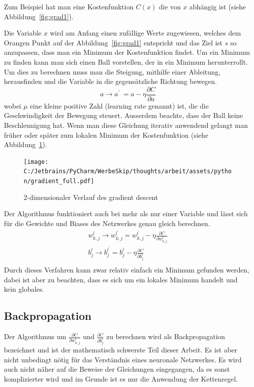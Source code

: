 \documentclass[12pt,a4paper]{report}
\begin{document}
Zum Beispiel hat man eine Kostenfunktion $C(x)$ die von $x$ abhängig ist (siehe Abbildung~\ref{fig:grad1}).

Die Variable $x$ wird am Anfang einen zufällige Werte zugewiesen,
welches dem Orangen Punkt auf der Abbildung~\ref{fig:grad1} entspricht und das Ziel ist $s$ so anzupassen,
dass man ein Minimum der Kostenfunktion findet.
Um ein Minimum zu finden kann man sich einen Ball vorstellen, der in ein Minimum herunterrollt.
Um dies zu berechnen muss man die Steigung, mithilfe einer Ableitung, herausfinden und die Variable in die
gegensätzliche Richtung bewegen.
\[a \rightarrow a^\prime\ = a - \eta\frac{\partial C}{\partial a}\]
wobei $\mu$ eine kleine positive Zahl (learning rate genannt) ist, die die Geschwindigkeit der Bewegung steuert.
Ausserdem beachte, dass der Ball keine Beschleunigung hat.
Wenn man diese Gleichung iterativ anwendend gelangt man früher oder später zum lokalen Minimum der Kostenfunktion (siehe Abbildung~\ref{fig:grad2}).

\begin{figure}[h]%
    \centering
    \texttt{[image: C:/Jetbrains/PyCharm/WerbeSkip/thoughts/arbeit/assets/python/gradient\_full.pdf]} %
    \caption{2-dimensionaler Verlauf des gradient descent}%
    \label{fig:grad2}%
\end{figure}

Der Algorithmus funktioniert auch bei mehr als nur einer Variable und lässt sich für die Gewichte und Biases des Netzwerkes genau gleich berechnen.
\begin{gather*}
    w^l_{k,j} \rightarrow w^{l^\prime}_{k,j} = w^l_{k,j} - \eta\frac{\partial C}{\partial w^l_{k,j}}\\
    b^l_j \rightarrow b^{l^\prime}_j = b^l_j - \eta\frac{\partial C}{\partial b^l_j}\\
\end{gather*}
Durch dieses Verfahren kann zwar relativ einfach ein Minimum gefunden werden, dabei ist aber zu beachten, dass es sich um ein lokales
Minimum handelt und kein globales.

\subsection{Backpropagation}
Der Algorithmus um $\frac{\partial C}{\partial w^l_{k,j}}$ und $\frac{\partial C}{\partial b^l_j}$ zu berechnen wird als
Backpropagation bezeichnet und ist der mathematisch schwerste Teil dieser Arbeit.
Es ist aber nicht unbedingt nötig für das Verständnis eines neuronale Netzwerkes.
Es wird auch nicht näher auf die Beweise der Gleichungen eingegangen,
da es sonst komplizierter wird und im Grunde ist es nur die Anwendung der Kettenregel.
\end{document}
